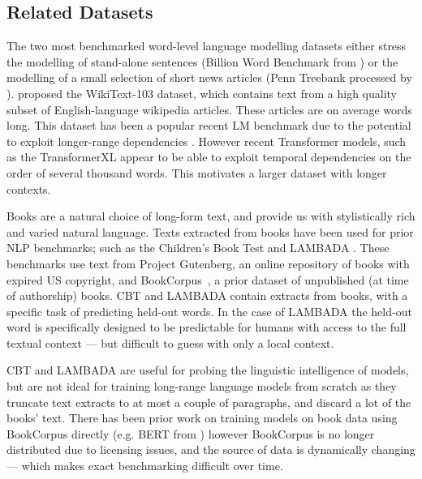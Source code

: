 \documentclass{article} \usepackage{iclr2020_conference,times}
\begin{document}
\subsection{Related Datasets}
The two most benchmarked word-level language modelling datasets either stress the modelling of stand-alone sentences (Billion Word Benchmark from \cite{chelba2013one}) or the modelling of a small selection of short news articles (Penn Treebank processed by \cite{mikolov2010recurrent}). \cite{merity2016pointer} proposed the WikiText-103 dataset, which contains text from a high quality subset of English-language wikipedia articles.  These articles are on average  words long. This dataset has been a popular recent LM benchmark due to the potential to exploit longer-range dependencies \citep{grave2016improving, rae2018fast, bai2018trellis}. However recent Transformer models, such as the TransformerXL \citep{dai2019transformer} appear to be able to exploit temporal dependencies on the order of several thousand words. This motivates a larger dataset with longer contexts.

Books are a natural choice of long-form text, and provide us with stylistically rich and varied natural language. Texts extracted from books have been used for prior NLP benchmarks; such as the Children's Book Test \citep{hill2015goldilocks} and LAMBADA \citep{paperno2016lambada}. These benchmarks use text from Project Gutenberg, an online repository of books with expired US copyright, and BookCorpus~\citep{zhu2015aligning}, a prior dataset of  unpublished (at time of authorship) books. CBT and LAMBADA contain extracts from books, with a specific task of predicting held-out words. In the case of LAMBADA the held-out word is specifically designed to be predictable for humans with access to the full textual context --- but difficult to guess with only a local context.

CBT and LAMBADA are useful for probing the linguistic intelligence of models, but are not ideal for training long-range language models from scratch as they truncate text extracts to at most a couple of paragraphs, and discard a lot of the books' text. There has been prior work on training models on book data using BookCorpus directly (e.g. BERT from \citet{devlin2018bert}) however BookCorpus is no longer distributed due to licensing issues, and the source of data is dynamically changing --- which makes exact benchmarking difficult over time. 
\end{document}
